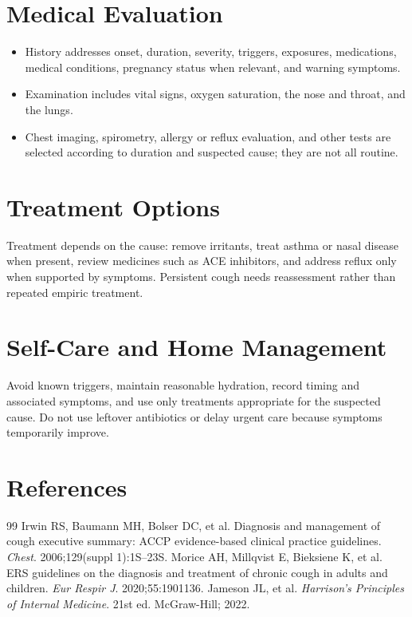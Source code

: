 \section*{Medical Evaluation}
\begin{itemize}
  \item History addresses onset, duration, severity, triggers, exposures, medications, medical conditions, pregnancy status when relevant, and warning symptoms.
  \item Examination includes vital signs, oxygen saturation, the nose and throat, and the lungs.
  \item Chest imaging, spirometry, allergy or reflux evaluation, and other tests are selected according to duration and suspected cause; they are not all routine.
\end{itemize}

\section*{Treatment Options}
Treatment depends on the cause: remove irritants, treat asthma or nasal disease when present, review medicines such as ACE inhibitors, and address reflux only when supported by symptoms. Persistent cough needs reassessment rather than repeated empiric treatment.

\section*{Self-Care and Home Management}
Avoid known triggers, maintain reasonable hydration, record timing and associated symptoms, and use only treatments appropriate for the suspected cause. Do not use leftover antibiotics or delay urgent care because symptoms temporarily improve.

\section*{References}
\begin{thebibliography}{99}
 Irwin RS, Baumann MH, Bolser DC, et al. Diagnosis and management of cough executive summary: ACCP evidence-based clinical practice guidelines. \textit{Chest}. 2006;129(suppl 1):1S--23S.
 Morice AH, Millqvist E, Bieksiene K, et al. ERS guidelines on the diagnosis and treatment of chronic cough in adults and children. \textit{Eur Respir J}. 2020;55:1901136.
 Jameson JL, et al. \textit{Harrison's Principles of Internal Medicine}. 21st ed. McGraw-Hill; 2022.
\end{thebibliography}
